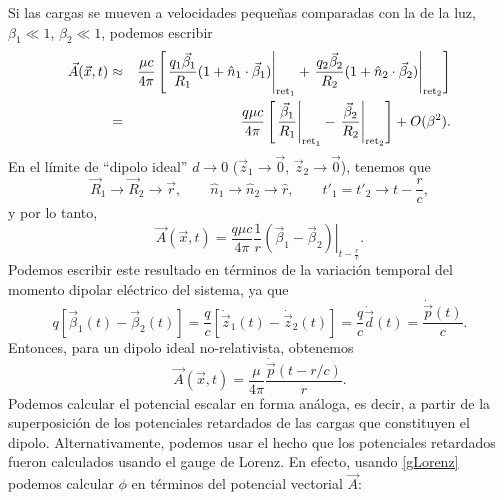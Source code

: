 Si las cargas se mueven a velocidades pequeñas comparadas con la de la luz, $\beta_1\ll 1$, $\beta_2\ll 1$, podemos escribir
\begin{eqnarray}
\vec{A}(\vec{x},t)&\approx&\frac{\mu c}{4\pi}\left[\left.\frac{q_1\vec{\beta}_1}{R_1}(1+\hat{n}_1\cdot\vec{\beta}_1)\right|_{{\rm ret}_1} +\left.\frac{q_2\vec{\beta}_2}{R_2}(1+\hat{n}_2\cdot\vec{\beta}_2)\right|_{{\rm ret}_2}\right] \\
&=&\frac{q\mu c}{4\pi}\left[\left.\frac{\vec{\beta}_1}{R_1}\right|_{{\rm ret}_1} -\left.\frac{\vec{\beta}_2}{R_2}\right|_{{\rm ret}_2}\right] +O(\beta^2).
\end{eqnarray}
En el límite de ``dipolo ideal'' $d\to 0$ ($\vec{z}_1\to\vec{0}$, $\vec{z}_2\to\vec{0}$), tenemos que
\begin{equation}
 \vec{R}_1\to\vec{R}_2\to\vec{r}, \qquad \hat{n}_1\to\hat{n}_2\to\hat{r}, \qquad  t'_1=t'_2\to t-\frac{r}{c},
\end{equation}
y por lo tanto,
\begin{equation}
 \vec{A}(\vec{x},t)=\frac{q\mu c}{4\pi}\frac{1}{r}\left.(\vec{\beta}_1-\vec{\beta}_2)\right|_{t-\frac{r}{c}}.
\end{equation}
Podemos escribir este resultado en términos de la variación temporal del momento dipolar eléctrico del sistema, ya que
\begin{equation}
q\left[\vec{\beta}_1(t)-\vec{\beta}_2(t)\right]=\frac{q}{c}\left[\dot{\vec{z}}_1(t)-\dot{\vec{z}}_2(t)\right]=\frac{q}{c}\dot{\vec{d}}(t)=\frac{\dot{\vec{p}}(t)}{c}.
\end{equation}
Entonces, para un dipolo ideal no-relativista, obtenemos
\begin{equation}
\boxed{\vec{A}(\vec{x},t)=\frac{\mu}{4\pi}\frac{\dot{\vec{p}}(t-{r}/{c})}{r}.} \label{Adipid}
\end{equation}
Podemos calcular el potencial escalar en forma análoga, es decir, a partir de la superposición de los potenciales retardados de las cargas que constituyen el dipolo. Alternativamente, podemos usar el hecho que los potenciales retardados fueron calculados usando el gauge de Lorenz. En efecto, usando \eqref{gLorenz} podemos calcular $\phi$ en términos del potencial vectorial $\vec{A}$:
